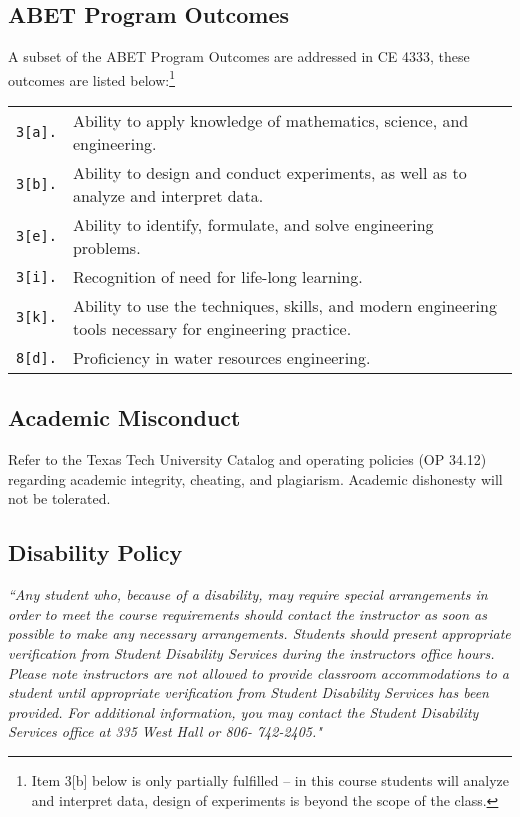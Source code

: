 \documentclass[12pt]{article}
\begin{document}
\subsection*{ABET Program Outcomes}
A subset of the ABET Program Outcomes are addressed in CE 4333, these outcomes are listed below:\footnote{Item 3[b] below is only partially fulfilled -- in this course students will analyze and interpret data, design of experiments is beyond the scope of the class.}

\begin{tabular}{p{0.5in}p{5.5in}}
\texttt{3[a].}  & Ability to apply knowledge of mathematics, science, and engineering.\\
\texttt{3[b].}  & Ability to design and conduct experiments, as well as to analyze and interpret data.\\
\texttt{3[e].}  & Ability to identify, formulate, and solve engineering problems.\\
\texttt{3[i].}   & Recognition of need for life-long learning.\\
\texttt{3[k].}  & Ability to use the techniques, skills, and modern engineering tools necessary for engineering practice.\\
\texttt{8[d].}  & Proficiency in water resources engineering.\\
\end{tabular}
\subsection*{Academic Misconduct}
Refer to the Texas Tech University Catalog and operating policies (OP 34.12) regarding
academic integrity, cheating, and plagiarism. Academic dishonesty will not be tolerated.
\subsection*{Disability Policy}
\textsl{ ``Any student who, because of a disability, may require special arrangements in order to meet
the course requirements should contact the instructor as soon as possible to make any necessary arrangements.
Students should present appropriate verification from Student Disability Services during the instructors office hours. Please note instructors are not allowed to provide classroom accommodations
to a student until appropriate verification from Student Disability Services has been provided.
For additional information, you may contact the Student Disability Services office at 335 West Hall or
806- 742-2405."}



\end{document}
